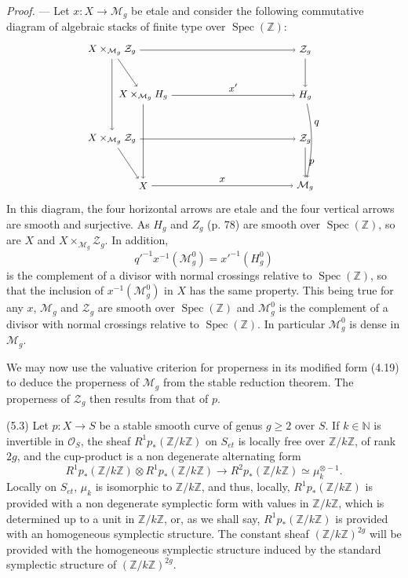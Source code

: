 \documentclass[10pt]{article}
\newcommand{\Spec}{\operatorname{Spec}}
\newcommand{\cO}{\mathcal O}
\begin{document}
\noindent\emph{Proof.} --- Let $x:X\to\mathcal M_g$ be etale and consider the following commutative diagram of algebraic stacks of finite type over $\Spec(\mathbb Z)$:
\[
\begin{tikzpicture}[baseline=(current bounding box.center), x=1cm, y=1cm, every node/.style={font=\small}]
\node (A) at (0,3.6) {$X\times_{\mathcal M_g}\mathcal Z_g$};
\node (B) at (6.2,3.6) {$\mathcal Z_g$};
\node (C) at (1.0,2.15) {$X\times_{\mathcal M_g}H_g$};
\node (D) at (6.2,2.15) {$H_g$};
\node (E) at (0,0.75) {$X\times_{\mathcal M_g}\mathcal Z_g$};
\node (F) at (6.2,0.75) {$\mathcal Z_g$};
\node (G) at (1.0,-0.75) {$X$};
\node (H) at (6.2,-0.75) {$\mathcal M_g$};
\draw[->] (A) -- (B);
\draw[->] (C) -- node[above] {$x'$} (D);
\draw[->] (E) -- (F);
\draw[->] (G) -- node[above] {$x$} (H);
\draw[->] (A) -- (E);
\draw[->] (B) -- (D);
\draw[->] (D) to[bend left=12] node[pos=0.25,right] {$q$} (H);
\draw[->] (F) -- node[right] {$p$} (H);
\draw[->] (A) -- (C);
\draw[->] (C) -- (G);
\draw[->] (E) -- (G);
\end{tikzpicture}
\]
In this diagram, the four horizontal arrows are etale and the four vertical arrows are smooth and surjective. As $H_g$ and $Z_g$ (p. 78) are smooth over $\Spec(\mathbb Z)$, so are $X$ and $X\times_{\mathcal M_g}\mathcal Z_g$. In addition,
\[
q'^{-1}x^{-1}(\mathcal M_g^0)=x'^{-1}(H_g^0)
\]
is the complement of a divisor with normal crossings relative to $\Spec(\mathbb Z)$, so that the inclusion of $x^{-1}(\mathcal M_g^0)$ in $X$ has the same property. This being true for any $x$, $\mathcal M_g$ and $\mathcal Z_g$ are smooth over $\Spec(\mathbb Z)$ and $\mathcal M_g^0$ is the complement of a divisor with normal crossings relative to $\Spec(\mathbb Z)$. In particular $\mathcal M_g^0$ is dense in $\mathcal M_g$.

We may now use the valuative criterion for properness in its modified form (4.19) to deduce the properness of $\mathcal M_g$ from the stable reduction theorem. The properness of $\mathcal Z_g$ then results from that of $p$.

\medskip
\noindent(5.3) Let $p:X\to S$ be a stable smooth curve of genus $g\geq2$ over $S$. If $k\in\mathbb N$ is invertible in $\cO_S$, the sheaf $R^1p_*(\mathbb Z/k\mathbb Z)$ on $S_{et}$ is locally free over $\mathbb Z/k\mathbb Z$, of rank $2g$, and the cup-product is a non degenerate alternating form
\[
R^1p_*(\mathbb Z/k\mathbb Z)\otimes R^1p_*(\mathbb Z/k\mathbb Z)
\longrightarrow R^2p_*(\mathbb Z/k\mathbb Z)\simeq\mu_k^{\otimes -1}.
\]
Locally on $S_{et}$, $\mu_k$ is isomorphic to $\mathbb Z/k\mathbb Z$, and thus, locally, $R^1p_*(\mathbb Z/k\mathbb Z)$ is provided with a non degenerate symplectic form with values in $\mathbb Z/k\mathbb Z$, which is determined up to a unit in $\mathbb Z/k\mathbb Z$, or, as we shall say, $R^1p_*(\mathbb Z/k\mathbb Z)$ is provided with an homogeneous symplectic structure. The constant sheaf $(\mathbb Z/k\mathbb Z)^{2g}$ will be provided with the homogeneous symplectic structure induced by the standard symplectic structure of $(\mathbb Z/k\mathbb Z)^{2g}$.
\end{document}
